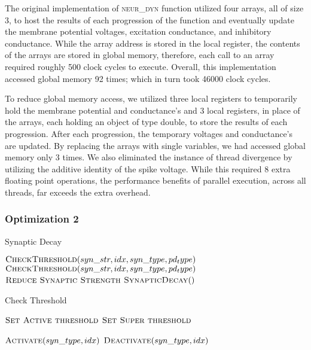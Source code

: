 \documentclass[a4paper]{article}
\begin{document}
The original implementation of \textsc{neur\_dyn} function utilized four arrays, all of size 3, to host the results of each progression of the function and eventually update the membrane potential voltages, excitation conductance, and inhibitory conductance. While the array address is stored in the local register, the contents of the arrays are stored in global memory, therefore, each call to an array required roughly 500 clock cycles to execute. Overall, this implementation accessed global memory 92 times; which in turn took 46000 clock cycles. 

To reduce global memory access, we utilized three local registers to temporarily hold the membrane potential and conductance's and 3 local registers, in place of the arrays, each holding an object of type double, to store the results of each progression. After each progression, the temporary voltages and conductance's are updated. By replacing the arrays with single variables, we had accessed global memory only 3 times. We also eliminated the instance of thread divergence by utilizing the additive identity of the spike voltage. While this required 8 extra floating point operations, the performance benefits of parallel execution, across all threads, far exceeds the extra overhead. 
 

\subsubsection{Optimization 2}

\begin{algorithm}[H]
\caption{Synaptic Decay}
\label{alg:decay}
\begin{algorithmic}
	\State $\textsc{CheckThreshold}(syn\_str, idx, syn\_type, pd_type)$
	\State $\textsc{CheckThreshold}(syn\_str, idx, syn\_type, pd_type)$
	\State $\textsc{Reduce Synaptic Strength}$
\EndFor
\State $\textsc{SynapticDecay}()$
\end{algorithmic}
\end{algorithm}

\begin{algorithm}[H]
\caption{Check Threshold}
\label{alg:check}
\begin{algorithmic}
	\State $\textsc{Set Active threshold}$
	\State $\textsc{Set Super threshold}$
\EndIf

	\State $\textsc{Activate}(syn\_type, idx)$
	\State $\textsc{Deactivate}(syn\_type, idx)$
\EndIf
\end{algorithmic}
\end{algorithm}
\end{document}
